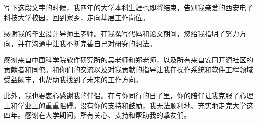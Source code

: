 \begin{thanksfor}
写下这段文字的时候，我四年的大学本科生涯也即将结束，告别我亲爱的西安电子科技大学校园，回到家乡，走向基层工作岗位。

感谢我的毕业设计导师王老师。在我撰写代码和论文期间，您给我指明了努力方向，并在沟通中让我不断完善自己对研究的想法。

感谢来自中国科学院软件研究所的吴老师和郑老师，以及所有来自安同开源社区的贡献者和同僚。和你们的交流以及对我贡献的指导让我在操作系统和软件工程领域受益颇丰，也帮助我找到了未来的工作方向。

此外，我也要衷心感谢我的伴侣。在与你同行的日子里，你的陪伴让我克服了心理上和学业上的重重阻碍。没有你的支持和鼓励，我无法顺利地、充实地走完大学这四年。感谢在大学期间，所有关心、支持和帮助我的挚友们。
\end{thanksfor}
